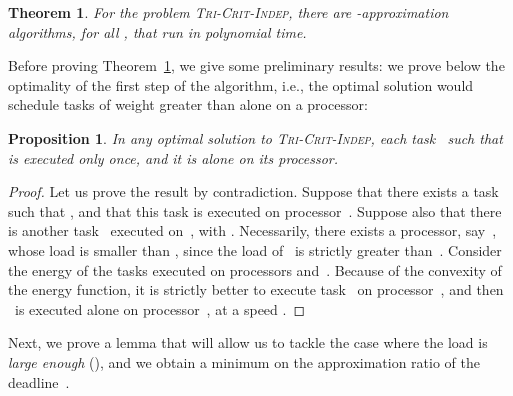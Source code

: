 \documentclass[a4paper]{article}
\theoremstyle{plain}
\newtheorem{theorem}{Theorem}
\newtheorem{proposition}{Proposition}
\theoremstyle{definition}
\theoremstyle{remark}
\newcommand{\fr}{\ensuremath{f_{\texttt{rel}}}\xspace}
\newcommand{\indep}{\textsc{Tri-Crit-In\-dep}\xspace}
\begin{document}
\begin{theorem}
    \label{thm.indep}
For the problem \indep, there are
-approxi\-mation
algorithms, for all , that run in
polynomial time.
\end{theorem}




Before proving Theorem~\ref{thm.indep}, we give some preliminary
results: we prove below the optimality of the first step of the
algorithm, i.e., the optimal solution would schedule tasks of weight
greater than  alone on a processor:

\begin{proposition}
  \label{prop.grobt}
  In any optimal solution to \indep, each task~ such that  
is executed only once, 
and it is alone on its processor.
\end{proposition}

\begin{proof}
  Let us prove the result by contradiction.  Suppose that there exists
  a task~ such that , and that
  this task is executed on processor~.  Suppose also that there
  is another task~ executed on~, with .
  Necessarily, there exists a processor, say~, whose load is
  smaller than , since the load of~ is strictly
  greater than~.
Consider the energy of the tasks executed on processors 
  and~. Because of the convexity of the energy function, it is
  strictly better to execute task~ on processor~, and then
  ~is executed alone on processor~, at a speed
  .  \end{proof}

\begin{comment}
\begin{proposition}
    \label{prop.sizereex}
For the problem \indep, if a task  is replicated or re-executed, then 
necessarily, .
\end{proposition}
\begin{proof}
  Since at least one of the execution of the task should be at a speed
  lower than  (otherwise we would not have a
  better energy than one execution at \fr), and since the deadline is
  , in order to match the deadline the weight of the task has to be
  strictly lower than . 
\end{proof}
\end{comment}





Next, we prove a lemma that will allow us to tackle the case where the
load is {\em large enough} (), and we obtain a minimum on the
approximation ratio of the deadline~. 
\end{document}
